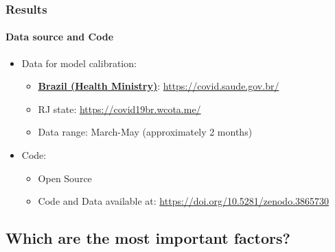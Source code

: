 \documentclass{beamer}
\begin{document}
\begin{frame}
\frametitle{Results} 
\framesubtitle{Data source and Code} 

\begin{itemize}
    \item Data for model calibration:
    \begin{itemize}
        \item \underline{\textbf{Brazil (Health Ministry)}}: \url{https://covid.saude.gov.br/}
        \item RJ state: \url{https://covid19br.wcota.me/}
        \item Data range: March-May (approximately 2 months)
    \end{itemize}
    \item Code:
    \begin{itemize}
        \item Open Source
        \item Code and Data available at: \url{https://doi.org/10.5281/zenodo.3865730}
    \end{itemize}
\end{itemize}

\end{frame}

\subsection{Which are the most important factors?}
\end{document}
